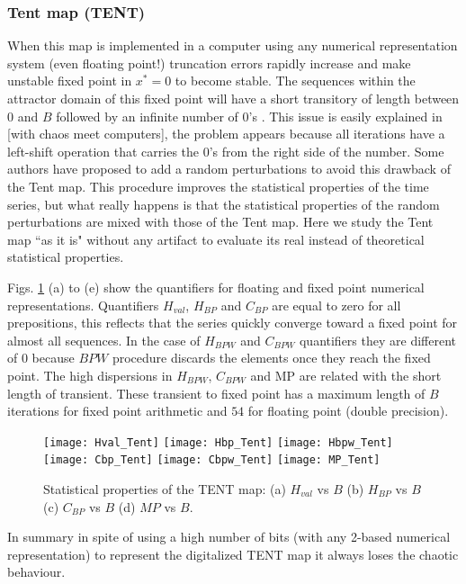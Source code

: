 \subsubsection{Tent map (TENT)} \label{sssec:tent}

When this map is implemented in a computer using any numerical representation system (even floating point!) truncation errors rapidly increase and make unstable fixed point in $x^*=0$ to become stable.
The sequences within the attractor domain of this fixed point will have a short transitory of length between $0$ and $B$ followed by an infinite number of  $0$'s \cite{Jessa2002,Callegari}.
This issue is easily explained in [with chaos meet computers], the problem appears because all iterations have a left-shift operation that carries the $0$'s from the right side of the number.
Some authors \cite{buscar} have proposed to add a random perturbations to avoid this drawback of the Tent map.
This procedure improves the statistical properties of the time series, but what really happens is that the statistical properties of the random perturbations are mixed with those of the Tent map.
Here we study the Tent map ``as it is" without any artifact to evaluate its real instead of theoretical statistical properties. 

Figs. \ref{fig:TENT_QuantiB} (a) to (e) show the quantifiers for floating and fixed point numerical representations.
Quantifiers $H_{val}$, $H_{BP}$ and $C_{BP}$ are equal to zero for all prepositions, this reflects that the series quickly converge toward a fixed point for almost all sequences.
In the case of $H_{BPW}$ and $C_{BPW}$ quantifiers they are different of $0$ because $BPW$ procedure discards the elements once they reach the fixed point.
The high dispersions in $H_{BPW}$, $C_{BPW}$ and MP are related with the short length of transient.
These transient to fixed point has a maximum length of $B$ iterations for fixed point arithmetic and $54$ for floating point (double precision).

\begin{figure}
	\texttt{[image: Hval\_Tent]}
	\texttt{[image: Hbp\_Tent]}
	\texttt{[image: Hbpw\_Tent]}
	\texttt{[image: Cbp\_Tent]}
	\texttt{[image: Cbpw\_Tent]}
	\texttt{[image: MP\_Tent]}
	\caption{Statistical properties of the TENT map: (a) $H_{val}$ vs $B$ (b) $H_{BP}$ vs $B$ (c) $C_{BP}$ vs $B$ (d) $MP$ vs $B$.}
	\label{fig:TENT_QuantiB}
\end{figure}

In summary in spite of using a high number of bits (with any 2-based numerical representation) to represent the digitalized TENT map it always loses the chaotic behaviour.
